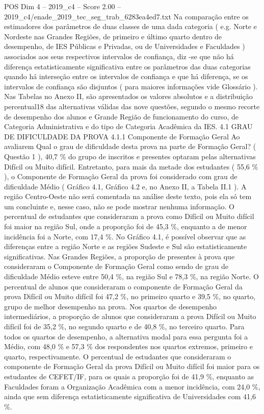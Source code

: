 \begin{textsample}{POS Dim 4 – 2019\_c4 – Score 2.00 – 2019\_c4/enade\_2019\_tec\_seg\_trab\_6283ea4ed7.txt}
Na comparação entre os estimadores dos parâmetros de duas classes de uma dada categoria ( e.g.
Norte e Nordeste nas Grandes Regiões, de primeiro e último quarto dentro de desempenho, de IES Públicas e Privadas, ou de Universidades e Faculdades ) associados aos seus respectivos intervalos de confiança, diz -se que não há diferença estatisticamente significativa entre os parâmetros das duas categorias quando há interseção entre os intervalos de confiança e que há diferença, se os intervalos de confiança são disjuntos ( para maiores informações vide Glossário ).
Nas Tabelas no Anexo II, são apresentados os valores absolutos e a distribuição percentual18 das alternativas válidas das nove questões, segundo o mesmo recorte de desempenho dos alunos e Grande Região de funcionamento do curso, de Categoria Administrativa e do tipo de Categoria Acadêmica da IES. 4.1 GRAU DE DIFICULDADE DA PROVA 4.1.1 Componente de Formação Geral Ao avaliarem Qual o grau de dificuldade desta prova na parte de Formação Geral? ( Questão 1 ), 40,7 \% do grupo de inscritos e presentes optaram pelas alternativas Difícil ou Muito difícil.
Entretanto, para mais da metade dos estudantes ( 55,6 \% ), o Componente de Formação Geral da prova foi considerado com grau de dificuldade Médio ( Gráfico 4.1, Gráfico 4.2 e, no Anexo II, a Tabela II.1 ).
A região Centro-Oeste não será comentada na análise deste texto, pois ela só tem um concluinte e, nesse caso, não se pode mostrar nenhuma informação.
O percentual de estudantes que consideraram a prova como Difícil ou Muito difícil foi maior na região Sul, onde a proporção foi de 45,3 \%, enquanto a de menor incidência foi a Norte, com 17,4 \%.
No Gráfico 4.1, é possível observar que as diferenças entre a região Norte e as regiões Sudeste e Sul são estatisticamente significativas.
Nas Grandes Regiões, a proporção de presentes à prova que consideraram o Componente de Formação Geral como sendo de grau de dificuldade Médio esteve entre 50,4 \%, na região Sul e 78,3 \%, na região Norte.
O percentual de alunos que consideraram o componente de Formação Geral da prova Difícil ou Muito difícil foi 47,2 \%, no primeiro quarto e 39,5 \%, no quarto, grupo de melhor desempenho na prova.
Nos quartos de desempenho intermediários, a proporção de alunos que consideraram a prova Difícil ou Muito difícil foi de 35,2 \%, no segundo quarto e de 40,8 \%, no terceiro quarto.
Para todos os quartos de desempenho, a alternativa modal para essa pergunta foi a Médio, com 48,0 \% e 57,3 \% dos respondentes nos quartos extremos, primeiro e quarto, respectivamente.
O percentual de estudantes que consideraram o componente de Formação Geral da prova Difícil ou Muito difícil foi maior para os estudantes de CEFET/IF, para os quais a proporção foi de 41,9 \%, enquanto as Faculdades foram a Organização Acadêmica com a menor incidência, com 24,0 \%, ainda que sem diferença estatisticamente significativa de Universidades com 41,6 \%.

\end{textsample}
